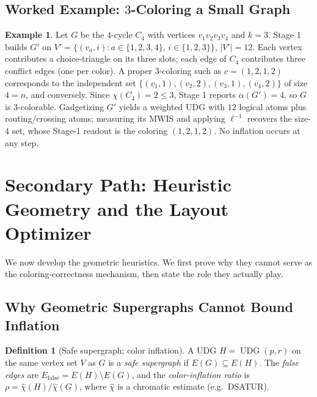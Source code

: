 \documentclass[11pt]{article}
\theoremstyle{definition}
\newtheorem{definition}[theorem]{Definition}
\newtheorem{example}[theorem]{Example}
\theoremstyle{remark}
\newcommand{\UDG}{\operatorname{UDG}}
\newcommand{\Efalse}{E_{\mathrm{false}}}
\newcommand{\chihat}{\widehat{\chi}}
\newcommand{\indep}{\alpha}
\begin{document}
\subsection{Worked Example: $3$-Coloring a Small Graph}
\label{sec:gadget-example}

\begin{example}
Let $G$ be the $4$-cycle $C_4$ with vertices $v_1v_2v_3v_4$ and $k=3$. Stage 1
builds $G'$ on $V'=\{(v_a,i): a\in\{1,2,3,4\},\,i\in\{1,2,3\}\}$, $|V'|=12$. Each
vertex contributes a choice-triangle on its three slots; each edge of $C_4$
contributes three conflict edges (one per color). A proper $3$-coloring such as
$c=(1,2,1,2)$ corresponds to the independent set
$\{(v_1,1),(v_2,2),(v_3,1),(v_4,2)\}$ of size $4=n$, and conversely. Since
$\chi(C_4)=2\le 3$, Stage 1 reports $\indep(G')=4$, so $G$ is $3$-colorable.
Gadgetizing $G'$ yields a weighted UDG with $12$ logical atoms plus routing/crossing
atoms; measuring its MWIS and applying $\ell^{-1}$ recovers the size-$4$ set, whose
Stage-1 readout is the coloring $(1,2,1,2)$. No inflation occurs at any step.
\end{example}

\section{Secondary Path: Heuristic Geometry and the Layout Optimizer}
\label{sec:heuristics}

We now develop the geometric heuristics. We first prove why they cannot serve as
the coloring-correctness mechanism, then state the role they actually play.

\subsection{Why Geometric Supergraphs Cannot Bound Inflation}
\label{sec:impossibility}

\begin{definition}[Safe supergraph; color inflation]
A UDG $H=\UDG(p,r)$ on the same vertex set $V$ as $G$ is a \emph{safe supergraph}
if $E(G)\subseteq E(H)$. The \emph{false edges} are $\Efalse=E(H)\setminus E(G)$,
and the \emph{color-inflation ratio} is $\rho = \chihat(H)/\chihat(G)$, where
$\chihat$ is a chromatic estimate (e.g.\ DSATUR).
\end{definition}
\end{document}
